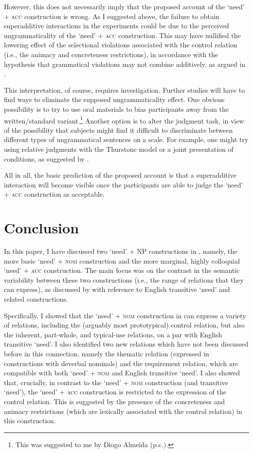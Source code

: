 \documentclass[output=paper]{langscibook}
\begin{document}
However, this does not necessarily imply that the proposed account of the `need' + \textsc{acc} construction is wrong. As I suggested above, the failure to obtain superadditive interactions in the experiments could be due to the perceived ungrammaticality of the `need' + \textsc{acc} construction. This may have nullified the lowering effect of the selectional violations associated with the control relation (i.e., the animacy and concreteness restrictions), in accordance with the hypothesis that grammatical violations may not combine additively, as argued in \citet{Hofmeister.Casasanto.Staum.Sag2014}.

This interpretation, of course, requires investigation. Further studies will have to find ways to eliminate the supposed ungrammaticality effect. One obvious possibility is to try to use oral materials to bias participants away from the written/standard variant.\footnote{This was suggested to me by Diogo Almeida (p.c.).} Another option is to alter the judgment task, in view of the possibility that subjects might find it difficult to discriminate between different types of ungrammatical sentences on a scale. For example, one might try using relative judgments with the Thurstone model \citep[see][]{Langsford.etal2018} or a joint presentation of conditions, as suggested by \citet{Marty.Chemla.Sprouse2020}.

All in all, the basic prediction of the proposed account is that a superadditive interaction will become visible once the participants are able to judge the `need' + \textsc{acc} construction as acceptable.

\section{Conclusion\label{section-conclusion}}

In this paper, I have discussed two `need' + NP constructions in , namely, the more basic `need' + \textsc{nom} construction and the more marginal, highly colloquial `need' + \textsc{acc} construction. The main focus was on the contrast in the semantic variability between these two constructions (i.e., the range of relations that they can express), as discussed by \citet{Zaroukian.Beller2013} with reference to English transitive `need' and related constructions.

Specifically, I showed that the `need' + \textsc{nom} construction in 
can express a variety of relations, including the (arguably most prototypical) control relation, but also the inherent, part-whole, and typical-use relations, on a par with English transitive `need'. I also identified two new relations which have not been discussed before in this connection, namely the thematic relation (expressed in constructions with deverbal nominals) and the requirement relation, which are compatible with both `need' + \textsc{nom} and English transitive `need'. I also showed that, crucially, in contrast to the `need' + \textsc{nom} construction (and transitive `need'), the `need' + \textsc{acc} construction is restricted to the expression of the control relation. This is suggested by the presence of the concreteness and animacy restrictions (which are lexically associated with the control relation) in this construction.
\end{document}
